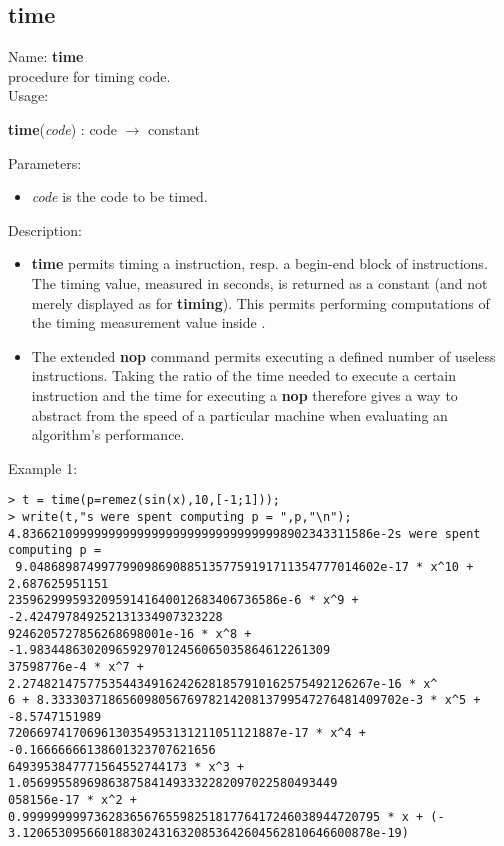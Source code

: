\subsection{time}
\label{labtime}
\noindent Name: \textbf{time}\\
\phantom{aaa}procedure for timing \sollya code.\\[0.2cm]
\noindent Usage: 
\begin{center}
\textbf{time}(\emph{code}) : \textsf{code} $\rightarrow$ \textsf{constant}\\
\end{center}
Parameters: 
\begin{itemize}
\item \emph{code} is the code to be timed.
\end{itemize}
\noindent Description: \begin{itemize}

\item \textbf{time} permits timing a \sollya instruction, resp. a begin-end block
   of \sollya instructions. The timing value, measured in seconds, is returned
   as a \sollya constant (and not merely displayed as for \textbf{timing}). This 
   permits performing computations of the timing measurement value inside \sollya.

\item The extended \textbf{nop} command permits executing a defined number of
   useless instructions. Taking the ratio of the time needed to execute a
   certain \sollya instruction and the time for executing a \textbf{nop}
   therefore gives a way to abstract from the speed of a particular 
   machine when evaluating an algorithm's performance.
\end{itemize}
\noindent Example 1: 
\begin{center}\begin{minipage}{15cm}\begin{Verbatim}[frame=single]
> t = time(p=remez(sin(x),10,[-1;1]));
> write(t,"s were spent computing p = ",p,"\n");
4.8366210999999999999999999999999999998902343311586e-2s were spent computing p =
 9.0486898749977990986908851357759191711354777014602e-17 * x^10 + 2.687625951151
23596299959320959141640012683406736586e-6 * x^9 + -2.424797849252131334907323228
9246205727856268698001e-16 * x^8 + -1.983448630209659297012456065035864612261309
37598776e-4 * x^7 + 2.2748214757753544349162426281857910162575492126267e-16 * x^
6 + 8.3333037186560980567697821420813799547276481409702e-3 * x^5 + -8.5747151989
72066974170696130354953131211051121887e-17 * x^4 + -0.16666666138601323707621656
6493953847771564552744173 * x^3 + 1.05699558969863875841493332282097022580493449
058156e-17 * x^2 + 0.99999999973628365676559825181776417246038944720795 * x + (-
3.1206530956601883024316320853642604562810646600878e-19)
\end{Verbatim}
\end{minipage}\end{center}
